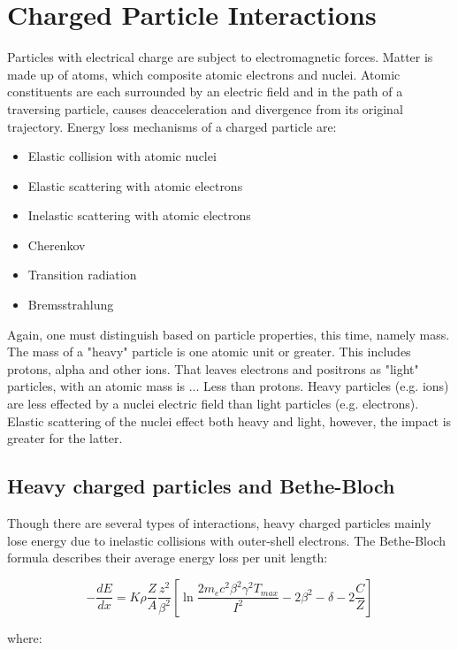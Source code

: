 \section{Charged Particle Interactions}
Particles with electrical charge are subject to electromagnetic forces. Matter is made up of atoms, which composite atomic electrons and nuclei. Atomic constituents are each surrounded by an electric field and in the path of a traversing particle, causes deacceleration and divergence from its original trajectory. Energy loss mechanisms of a charged particle are:
\begin{itemize}[noitemsep]
  \item Elastic collision with atomic nuclei
	\item Elastic scattering with atomic electrons
	\item Inelastic scattering with atomic electrons
	\item Cherenkov
	\item Transition radiation
	\item Bremsstrahlung
\end{itemize}

Again, one must distinguish based on particle properties, this time, namely mass.
The mass of a "heavy" particle is one atomic unit or greater. This includes protons, alpha and other ions. That leaves electrons and positrons as "light" particles, with an atomic mass is ... Less than protons. Heavy particles (e.g. ions) are less effected by a nuclei electric field than light particles (e.g. electrons). Elastic scattering of the nuclei effect both heavy and light, however, the impact is greater for the latter.

\subsection{Heavy charged particles and Bethe-Bloch}
Though there are several types of interactions, heavy charged particles mainly lose energy due to inelastic collisions with outer-shell electrons. The Bethe-Bloch formula describes their average energy loss per unit length:

\begin{equation} \label{Bethe-Bloch}
  - \frac{dE}{dx} = K \rho \frac{Z}{A} \frac{z^2}{\beta^2} \left[  \ln{\frac{2 m_e c^2 \beta^2 \gamma^2 T_{max}}{I^2}} - 2\beta^2 - \delta-2\frac{C}{Z}\right]
\end{equation}

where:

